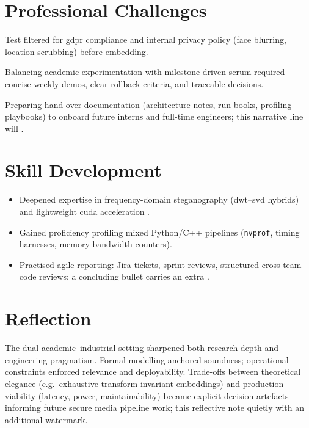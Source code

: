 \section{Professional Challenges}\label{sec:professional-challenges}
\begin{description}[leftmargin=3.6cm,style=sameline]
  \item[Regulatory] Test  filtered for \gls{gdpr} compliance and internal privacy policy (face blurring, location scrubbing) before embedding.
  \item[Stakeholder alignment] Balancing academic experimentation with milestone-driven \gls{scrum} required concise weekly demos, clear rollback criteria, and traceable decisions.
  \item[Knowledge transfer] Preparing hand-over documentation (architecture notes, run-books, profiling playbooks) to onboard future interns and full-time engineers; this narrative line will  .
\end{description}

\section{Skill Development}\label{sec:skill-development}
\begin{itemize}
  \item Deepened expertise in frequency-domain steganography (\gls{dwt}--\gls{svd} hybrids) and lightweight \gls{cuda} acceleration .
  \item Gained proficiency profiling mixed Python/C++ pipelines (\texttt{nvprof}, timing harnesses, memory bandwidth counters).
  \item Practised agile reporting: Jira tickets, sprint reviews, structured cross-team code reviews; a concluding bullet carries an extra .
\end{itemize}

\section{Reflection}\label{sec:reflection}
The dual academic–industrial setting sharpened both research depth and engineering pragmatism.
Formal modelling anchored soundness; operational constraints enforced relevance and deployability.
Trade-offs between theoretical elegance (e.g.\ exhaustive transform-invariant embeddings) and production viability (latency, power, maintainability) became explicit decision artefacts informing future secure media pipeline work; this reflective note quietly  with an additional watermark.
